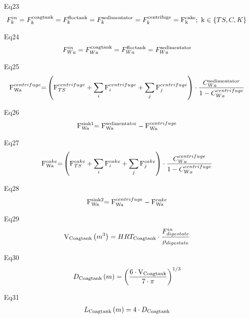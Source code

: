 \documentclass[10pt,a4paper]{article}
\begin{document}
Eq23
\begin{align}
	F_k^{in} = F_k^{{\rm{coag tank}}} = F_k^{{\rm{floc tank}}} = F_k^{{\rm{sedimentator}}} = F_k^{{\rm{centrifuge}}} = {\rm{F}}_{\rm{k}}^{{\rm{cake}}}; \ {\rm{   k}} \in \left\{ {TS,C,K} \right\}{\rm{ }}
\end{align}

Eq24
\begin{align}
	F_{Wa}^{in} = F_{Wa}^{{\rm{coag tank}}} = F_{Wa}^{{\rm{floc tank}}} = F_{Wa}^{{\rm{sedimentator}}}
\end{align}

Eq25
\begin{align}
	{\rm{F}}_{{\rm{Wa}}}^{centrifuge}{\rm{ = }}\left( {{\rm{F}}_{TS}^{centrifuge} + \sum\limits_i {{\rm{F}}_i^{centrifuge} + \sum\limits_j {{\rm{F}}_j^{centrifuge}} } } \right) \cdot \frac{{C_{Wa}^{{\rm{sedimentato}}r}}}{{1 - C_{Wa}^{centrifuge}}}
\end{align}

Eq26
\begin{align}
	{\rm{F}}_{{\rm{Wa}}}^{{\rm{sink1}}}{\rm{ = F}}_{{\rm{Wa}}}^{{\rm{sedimentator}}} - {\rm{F}}_{{\rm{Wa}}}^{centrifuge}
\end{align}

Eq27
\begin{align}
	{\rm{F}}_{{\rm{Wa}}}^{cake}{\rm{ = }}\left( {{\rm{F}}_{TS}^{cake} + \sum\limits_i {{\rm{F}}_i^{cake} + \sum\limits_j {{\rm{F}}_j^{cake}} } } \right) \cdot \frac{{C_{Wa}^{centrifuge}}}{{1 - C_{Wa}^{centrifuge}}}
\end{align}

Eq28
\begin{align}
	{\rm{F}}_{{\rm{Wa}}}^{{\rm{sink2}}}{\rm{ = F}}_{{\rm{Wa}}}^{centrifuge} - {\rm{F}}_{{\rm{Wa}}}^{cake}
\end{align}

Eq29
\begin{align}
	{{\rm{V}}_{{\rm{Coag tank}}}}\left( {{m^3}} \right) = HR{T_{{\rm{Coag tank}}}}\cdot\frac{{F_{digestate}^{in}}}{{{\rho _{digestate}}}}
\end{align}

Eq30
\begin{align}
	{D_{{\rm{Coag tank}}}}\left( m \right) = {\left( {\frac{{6\cdot{{\rm{V}}_{{\rm{Coag tank}}}}}}{{7\cdot\pi }}} \right)^{1/3}}
\end{align}

Eq31
\begin{align}
	{L_{{\rm{Coag tank}}}}\left( m \right) = 4\cdot{D_{{\rm{Coag tank}}}}
\end{align}
\end{document}
